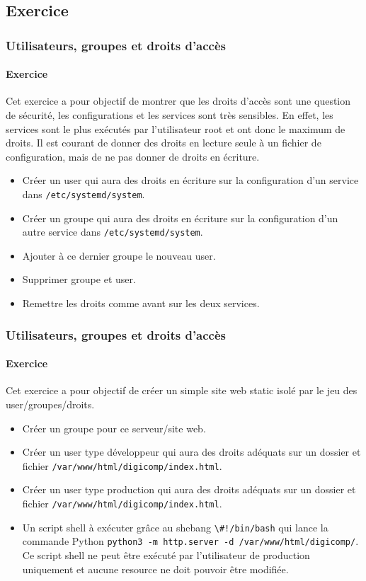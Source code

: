 \documentclass{beamer}
\begin{document}
    \subsection{Exercice}\label{subsec:user-group-rights-exercice}
    \begin{frame}
        \transdissolve
        \frametitle{Utilisateurs, groupes et droits d'accès}
        \framesubtitle{Exercice \execcounterdispinc}
        Cet exercice a pour objectif de montrer que les droits d'accès sont une question de sécurité, les configurations et les services sont très sensibles.
        En effet, les services sont le plus exécutés par l'utilisateur root et ont donc le maximum de droits.
        \bigbreak
        Il est courant de donner des droits en lecture seule à un fichier de configuration, mais de ne pas donner de droits en écriture.
        \begin{itemize}
            \item Créer un user qui aura des droits en écriture sur la configuration d'un service dans \lstinline{/etc/systemd/system}.
            \item Créer un groupe qui aura des droits en écriture sur la configuration d'un autre service dans \lstinline{/etc/systemd/system}.
            \item Ajouter à ce dernier groupe le nouveau user.
            \item Supprimer groupe et user.
            \item Remettre les droits comme avant sur les deux services.
        \end{itemize}
    \end{frame}

    \begin{frame}
        \transdissolve
        \frametitle{Utilisateurs, groupes et droits d'accès}
        \framesubtitle{Exercice \execcounterdispinc}
        Cet exercice a pour objectif de créer un simple site web static isolé par le jeu des user/groupes/droits.
        \begin{itemize}
            \item Créer un groupe pour ce serveur/site web.
            \item Créer un user type développeur qui aura des droits adéquats sur un dossier et fichier \lstinline{/var/www/html/digicomp/index.html}.
            \item Créer un user type production qui aura des droits adéquats sur un dossier et fichier \lstinline{/var/www/html/digicomp/index.html}.
            \item Un script shell à exécuter grâce au shebang \lstinline{\#!/bin/bash} qui lance la commande Python \lstinline{python3 -m http.server -d /var/www/html/digicomp/}.
            Ce script shell ne peut être exécuté par l'utilisateur de production uniquement et aucune resource ne doit pouvoir être modifiée.
        \end{itemize}
    \end{frame}
\end{document}

